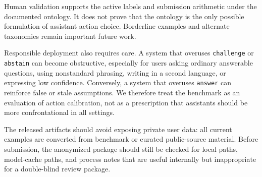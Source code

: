 Human validation supports the active labels and submission arithmetic under the documented ontology. It does not prove that the ontology is the only possible formulation of assistant action choice. Borderline examples and alternate taxonomies remain important future work.

Responsible deployment also requires care. A system that overuses \texttt{challenge} or \texttt{abstain} can become obstructive, especially for users asking ordinary answerable questions, using nonstandard phrasing, writing in a second language, or expressing low confidence. Conversely, a system that overuses \texttt{answer} can reinforce false or stale assumptions. We therefore treat the benchmark as an evaluation of action calibration, not as a prescription that assistants should be more confrontational in all settings.

The released artifacts should avoid exposing private user data: all current examples are converted from benchmark or curated public-source material. Before submission, the anonymized package should still be checked for local paths, model-cache paths, and process notes that are useful internally but inappropriate for a double-blind review package.
